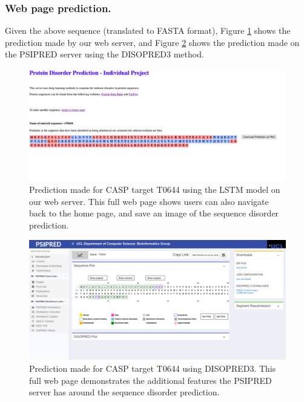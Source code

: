 \documentclass{l4proj}
\begin{document}
\begin{appendices}
\subsubsection{Web page prediction.}
\label{chap:appendix sec:webpagepred}
Given the above sequence (translated to FASTA format), Figure \ref{fig:fullmypred} shows the prediction made by our web server, and Figure \ref{fig:disopredpred} shows the prediction made on the PSIPRED server using the DISOPRED3 method.

\begin{figure}[!htb]
    \centering
    \includegraphics[width=\linewidth]{images/web_eval/mypredCasp.pdf}

    \caption{Prediction made for CASP target T0644 using the LSTM model on our web server. This full web page shows users can also navigate back to the home page, and save an image of the sequence disorder prediction.}

    \label{fig:fullmypred} 
\end{figure}


\begin{figure}[!htb]
    \centering
    \includegraphics[width=\linewidth]{images/web_eval/DISOPREDCasp.pdf}

    \caption{Prediction made for CASP target T0644 using DISOPRED3. This full web page demonstrates the additional features the PSIPRED server has around the sequence disorder prediction.}

    \label{fig:disopredpred} 
\end{figure}


\end{appendices}
\end{document}
